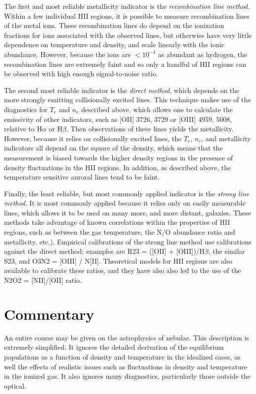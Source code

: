 The first and most reliable metallicity indicator is the {\it
recombination line method}. Within a few individual HII regions, it is
possible to measure recombination lines of the metal ions. These
recombination lines do depend on the ionization fractions for ions
associated with the observed lines, but otherwise have very little
dependence on temperature and density, and scale linearly with the
ionic abundance. However, because the ions are $<10^{-4}$ as abundant
as hydrogen, the recombination lines are extremely faint and so only a
handful of HII regions can be observed with high enough
signal-to-noise ratio.

The second most reliable indicator is the {\it direct method}, which
depends on the more strongly emitting collisionally excited
lines. This technique makes use of the diagnostics for $T_e$ and $n_e$
described above, which allows one to calculate the emissivity of other
indicators, such as [OII] 3726, 3729 or [OIII] 4959, 5008, relative to
H$\alpha$ or H$\beta$. Then observations of these lines yields the
metallicity. However, because it relies on collisionally excited
lines, the $T_e$, $n_e$, and metallicity indicators all depend on the
square of the density, which means that the measurement is biased
towards the higher density regions in the presence of density
fluctuations in the HII regions. In addition, as described above, the
temperature sensitive auroral lines tend to be faint.

Finally, the least reliable, but most commonly applied indicator is
the {\it strong line method}. It is most commonly applied because it
relies only on easily measurable lines, which allows it to be used on
many more, and more distant, galaxies. These methods take advantage of
known correlations within the properties of HII regions, such as
between the gas temperature, the N/O abundance ratio and metallicity,
etc.). Empirical calibrations of the strong line method use
calibrations against the direct method; examples are R23 = ([OII] +
[OIII])$/$H$\beta$, the similar S23, and O3N2 = [OIII] / N[II].
Theoretical models for HII regions are also available to calibrate
these ratios, and they have also also led to the use of the N2O2 =
[NII]/[OII] ratio.

\section{Commentary}

An entire course may be given on the astrophysics of nebulae. This
description is extremely simplified. It ignores the detailed
derivation of the equilibrium populations as a function of density and
temperature in the idealized cases, as well the effects of realistic
issues such as fluctuations in density and temperature in the ionized
gas. It also ignores many diagnostics, particularly those outside the
optical.


